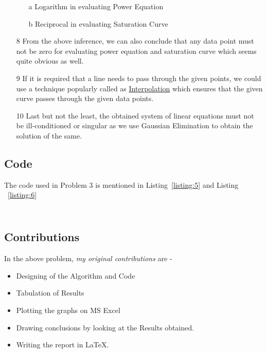 \documentclass[titlepage, 11pt]{article}
\begin{document}
\begin{itemize}
     \begin{itemize}
         \item [a] Logarithm in evaluating Power Equation
         \item [b] Reciprocal in evaluating Saturation Curve
     \end{itemize}
     \item [8] From the above inference, we can also conclude that any data point must not be zero for evaluating power equation and saturation curve which seems quite obvious as well. 
     \item [9] If it is required that a line needs to pass through the given points, we could use a technique popularly called as \href{https://en.wikipedia.org/wiki/Interpolation}{Interpolation} which ensures that the given curve passes through the given data points.
     \item [10] Last but not the least, the obtained system of linear equations must not be ill-conditioned or singular as we use Gaussian Elimination to obtain the solution of the same. 
\end{itemize}


\subsection{Code}
The code used in Problem 3 is mentioned in Listing~\ref{listing:5} and Listing ~\ref{listing:6}

\inputminted[breaklines,
 mathescape,
 linenos,
 numbersep=5pt,
 frame=single,
 numbersep=5pt,
 xleftmargin=0pt]{c}{A5P2L.c}
\label{listing:5}

\inputminted[breaklines,
 mathescape,
 linenos,
 numbersep=5pt,
 frame=single,
 numbersep=5pt,
 xleftmargin=0pt]{c}{A5P2P.c}
\label{listing:6}



\subsection{Contributions}
In the above problem, \textit{my original contributions} are - 
\begin{itemize}
    \item Designing of the Algorithm and Code
    \item Tabulation of Results
    \item Plotting the graphs on MS Excel
    \item Drawing conclusions by looking at the Results obtained.
    \item Writing the report in LaTeX. 
\end{itemize}
\end{document}
